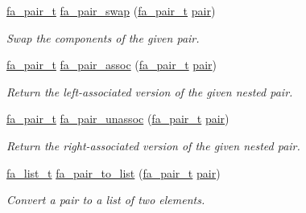 \begin{DoxyCompactItemize}
\hyperlink{group___fa_pair_gac2b2e58c230bac4f8a63ef6c05072680}{fa\-\_\-pair\-\_\-t} \hyperlink{group___fa_pair_gab905200bb654bfd3cfc36c2adf4383fd}{fa\-\_\-pair\-\_\-swap} (\hyperlink{group___fa_pair_gac2b2e58c230bac4f8a63ef6c05072680}{fa\-\_\-pair\-\_\-t} \hyperlink{util_8h_a40ed40659d2ed7f8712b0fe6ba6edebe}{pair})
\begin{DoxyCompactList}\small\item\em Swap the components of the given pair. \end{DoxyCompactList}\item 
\hyperlink{group___fa_pair_gac2b2e58c230bac4f8a63ef6c05072680}{fa\-\_\-pair\-\_\-t} \hyperlink{group___fa_pair_gaa8b9eb2a799ec3993b5f9127ed511188}{fa\-\_\-pair\-\_\-assoc} (\hyperlink{group___fa_pair_gac2b2e58c230bac4f8a63ef6c05072680}{fa\-\_\-pair\-\_\-t} \hyperlink{util_8h_a40ed40659d2ed7f8712b0fe6ba6edebe}{pair})
\begin{DoxyCompactList}\small\item\em Return the left-\/associated version of the given nested pair. \end{DoxyCompactList}\item 
\hyperlink{group___fa_pair_gac2b2e58c230bac4f8a63ef6c05072680}{fa\-\_\-pair\-\_\-t} \hyperlink{group___fa_pair_gaff4d8830c9436aa7fa6b0ca0a99c06f8}{fa\-\_\-pair\-\_\-unassoc} (\hyperlink{group___fa_pair_gac2b2e58c230bac4f8a63ef6c05072680}{fa\-\_\-pair\-\_\-t} \hyperlink{util_8h_a40ed40659d2ed7f8712b0fe6ba6edebe}{pair})
\begin{DoxyCompactList}\small\item\em Return the right-\/associated version of the given nested pair. \end{DoxyCompactList}\item 
\hyperlink{group___fa_list_ga35ecb12ab934ded0cce0bcf28e3bc5d2}{fa\-\_\-list\-\_\-t} \hyperlink{group___fa_pair_gac21e1f6a5da734bf51986b7ab413c810}{fa\-\_\-pair\-\_\-to\-\_\-list} (\hyperlink{group___fa_pair_gac2b2e58c230bac4f8a63ef6c05072680}{fa\-\_\-pair\-\_\-t} \hyperlink{util_8h_a40ed40659d2ed7f8712b0fe6ba6edebe}{pair})
\begin{DoxyCompactList}\small\item\em Convert a pair to a list of two elements. \end{DoxyCompactList}\end{DoxyCompactItemize}


